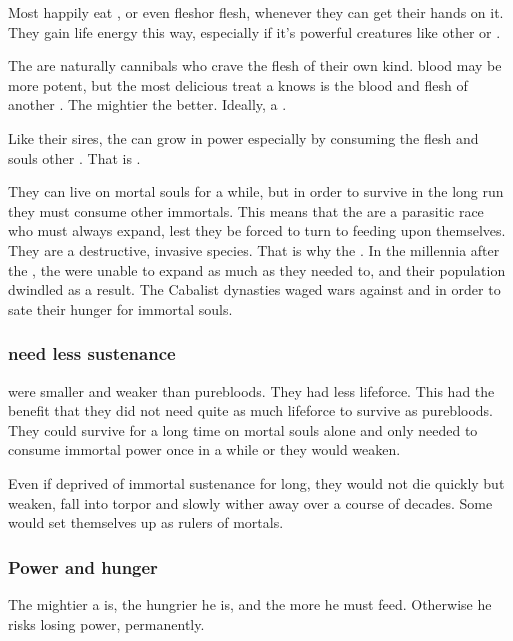 Most \Resphain{} happily eat \human, \scatha{} or even \resphan{} flesh\dash or \dragon{} flesh, whenever they can get their hands on it. They gain life energy this way, especially if it's powerful creatures like other \resphain{} or \dragons. 

The \resphain{} are naturally cannibals who crave the flesh of their own kind. 
\Draconian{} blood may be more potent, but the most delicious treat a \resphan{} knows is the blood and flesh of another \resphan{}. 
The mightier the better. 
Ideally, a .

Like their \SitraAchra sires, the \resphain{} can grow in power especially by consuming the flesh and souls other \resphain. 
That is .

They can live on mortal souls for a while, but in order to survive in the long run they must consume other immortals. 
This means that the \resphain{} are a parasitic race who must always expand, lest they be forced to turn to feeding upon themselves. 
They are a destructive, invasive species. 
That is why the \feud{} . 
In the millennia after the , the \resphain{} were unable to expand as much as they needed to, and their population dwindled as a result. 
The Cabalist dynasties waged wars against \Kezerad{} and \Baelzerach{} in order to sate their hunger for immortal souls. 




\subsubsection{\Bezedeth need less sustenance}
\Bezedeth were smaller and weaker than purebloods.
They had less lifeforce. 
This had the benefit that they did not need quite as much lifeforce to survive as purebloods. 
They could survive for a long time on mortal souls alone and only needed to consume immortal power once in a while or they would weaken.

Even if deprived of immortal sustenance for long, they would not die quickly but weaken, fall into torpor and slowly wither away over a course of decades.
Some would set themselves up as rulers of mortals\dash {}.





\subsubsection{Power and hunger}
The mightier a \resphan{} is, the hungrier he is, and the more he must feed. Otherwise he risks losing power, permanently. 

